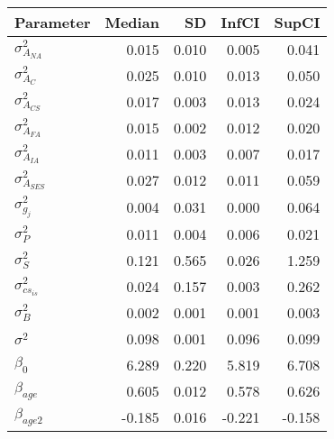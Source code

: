 \begin{table}[ht]
\centering
\begin{tabular}{lrrrr}
  \hline
Parameter & Median & SD & InfCI & SupCI \\ 
  \hline
$\sigma^{2}_{A_{NA}}$ & 0.015 & 0.010 & 0.005 & 0.041 \\ 
  $\sigma^{2}_{A_{C}}$ & 0.025 & 0.010 & 0.013 & 0.050 \\ 
  $\sigma^{2}_{A_{CS}}$ & 0.017 & 0.003 & 0.013 & 0.024 \\ 
  $\sigma^{2}_{A_{FA}}$ & 0.015 & 0.002 & 0.012 & 0.020 \\ 
  $\sigma^{2}_{A_{IA}}$ & 0.011 & 0.003 & 0.007 & 0.017 \\ 
  $\sigma^{2}_{A_{SES}}$ & 0.027 & 0.012 & 0.011 & 0.059 \\ 
  $\sigma^{2}_{g_{j}}$ & 0.004 & 0.031 & 0.000 & 0.064 \\ 
  $\sigma^{2}_{P}$ & 0.011 & 0.004 & 0.006 & 0.021 \\ 
  $\sigma^{2}_{S}$ & 0.121 & 0.565 & 0.026 & 1.259 \\ 
  $\sigma^{2}_{cs_{is}}$ & 0.024 & 0.157 & 0.003 & 0.262 \\ 
  $\sigma^{2}_{B}$ & 0.002 & 0.001 & 0.001 & 0.003 \\ 
  $\sigma^{2}$ & 0.098 & 0.001 & 0.096 & 0.099 \\ 
  $\beta_{0}$ & 6.289 & 0.220 & 5.819 & 6.708 \\ 
  $\beta_{age}$ & 0.605 & 0.012 & 0.578 & 0.626 \\ 
  $\beta_{age2}$ & -0.185 & 0.016 & -0.221 & -0.158 \\ 
   \hline
\end{tabular}
\end{table}
